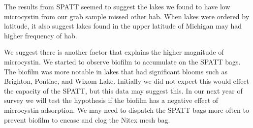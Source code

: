 












The results from SPATT seemed to suggest the lakes we found to have low microcystin from our grab sample missed other \gls{hab}. When lakes were ordered by latitude, it also suggest lakes found in the upper latitude of Michigan may had higher frequency of \gls{hab}.

We suggest there is another factor that explains the higher magnitude of microcystin. We started to observe biofilm to accumulate on the SPATT bags. The biofilm was more notable in lakes that had significant blooms such as Brighton, Pontiac, and Wixom Lake. Initially we did not expect this would effect the capacity of the SPATT, but this data may suggest this. In our next year of survey we will test the hypothesis if the biofilm has a negative effect of microcystin adsorption. We may need to dispatch the SPATT bags more often to prevent biofilm to encase and clog the Nitex mesh bag.



